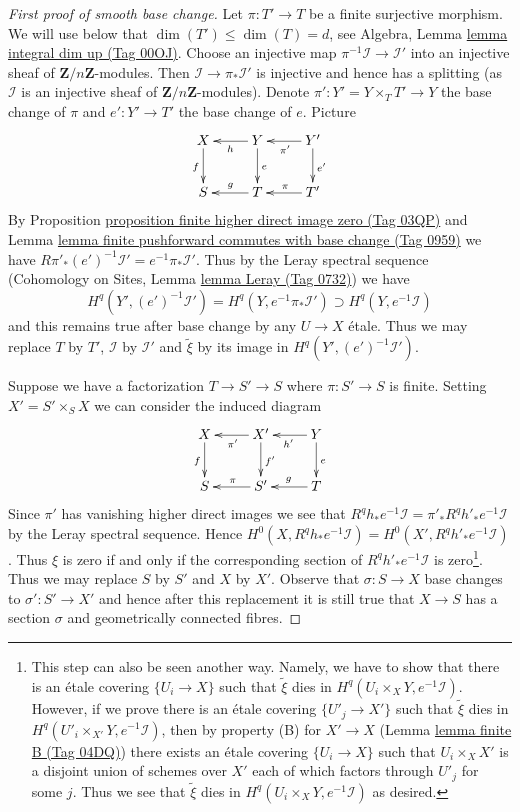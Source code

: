 \documentclass{amsart}
\theoremstyle{plain}
\theoremstyle{definition}
\theoremstyle{remark}
\numberwithin{equation}{subsection}
\begin{document}
\begin{proof}[First proof of smooth base change]
\medskip\noindent
Let $\pi : T' \to T$ be a finite surjective morphism.
We will use below that $\dim(T') \leq \dim(T) = d$, see
Algebra, Lemma \href{https://stacks.math.columbia.edu/tag/00OJ}{lemma integral dim up (Tag 00OJ)}.
Choose an injective map $\pi^{-1}\mathcal{I} \to \mathcal{I}'$
into an injective sheaf of $\mathbf{Z}/n\mathbf{Z}$-modules.
Then $\mathcal{I} \to \pi_*\mathcal{I}'$ is injective
and hence has a splitting (as $\mathcal{I}$ is an injective
sheaf of $\mathbf{Z}/n\mathbf{Z}$-modules).
Denote $\pi' : Y' = Y \times_T T' \to Y$ the base change of $\pi$
and $e' : Y' \to T'$ the base change of $e$. Picture
$$
\xymatrix{
X \ar[d]_f & Y \ar[l]^h \ar[d]^e & Y' \ar[l]^{\pi'} \ar[d]^{e'} \\
S & T \ar[l]_g & T' \ar[l]_\pi
}
$$
By Proposition \href{https://stacks.math.columbia.edu/tag/03QP}{proposition finite higher direct image zero (Tag 03QP)} and
Lemma \href{https://stacks.math.columbia.edu/tag/0959}{lemma finite pushforward commutes with base change (Tag 0959)} we have
$R\pi'_*(e')^{-1}\mathcal{I}' = e^{-1}\pi_*\mathcal{I}'$.
Thus by the Leray spectral sequence
(Cohomology on Sites, Lemma \href{https://stacks.math.columbia.edu/tag/0732}{lemma Leray (Tag 0732)})
we have
$$
H^q(Y', (e')^{-1}\mathcal{I}') =
H^q(Y, e^{-1}\pi_*\mathcal{I}') \supset H^q(Y, e^{-1}\mathcal{I})
$$
and this remains true after base change by any $U \to X$ \'etale.
Thus we may replace $T$ by $T'$, $\mathcal{I}$ by $\mathcal{I}'$
and $\tilde \xi$ by its image in $H^q(Y', (e')^{-1}\mathcal{I}')$.

\medskip\noindent
Suppose we have a factorization $T \to S' \to S$ where
$\pi : S' \to S$ is finite.
Setting $X' = S' \times_S X$ we can consider the induced diagram
$$
\xymatrix{
X \ar[d]_f & X' \ar[l]^{\pi'} \ar[d]^{f'} & Y \ar[l]^{h'} \ar[d]^e \\
S & S' \ar[l]_\pi & T \ar[l]_g
}
$$
Since $\pi'$ has vanishing higher direct images we see that
$R^qh_*e^{-1}\mathcal{I} = \pi'_*R^qh'_*e^{-1}\mathcal{I}$
by the Leray spectral sequence. Hence
$H^0(X, R^qh_*e^{-1}\mathcal{I}) = H^0(X', R^qh'_*e^{-1}\mathcal{I})$.
Thus $\xi$ is zero if and only if the corresponding section of
$R^qh'_*e^{-1}\mathcal{I}$ is zero\footnote{This
step can also be seen another way. Namely, we have to show that
there is an \'etale covering $\{U_i \to X\}$ such that
$\tilde \xi$ dies in $H^q(U_i \times_X Y, e^{-1}\mathcal{I})$.
However, if we prove there is an \'etale covering
$\{U'_j \to X'\}$ such that $\tilde \xi$ dies in
$H^q(U'_i \times_{X'} Y, e^{-1}\mathcal{I})$, then by property (B)
for $X' \to X$ (Lemma \href{https://stacks.math.columbia.edu/tag/04DQ}{lemma finite B (Tag 04DQ)}) there exists an \'etale covering
$\{U_i \to X\}$ such that $U_i \times_X X'$ is a disjoint union
of schemes over $X'$ each of which factors through $U'_j$ for some $j$.
Thus we see that $\tilde \xi$ dies in $H^q(U_i \times_X Y, e^{-1}\mathcal{I})$
as desired.}.
Thus we may replace $S$ by $S'$ and $X$ by $X'$.
Observe that $\sigma : S \to X$ base changes to $\sigma' : S' \to X'$
and hence after this replacement it is still true that $X \to S$
has a section $\sigma$ and geometrically connected fibres.


\end{proof}
\end{document}
